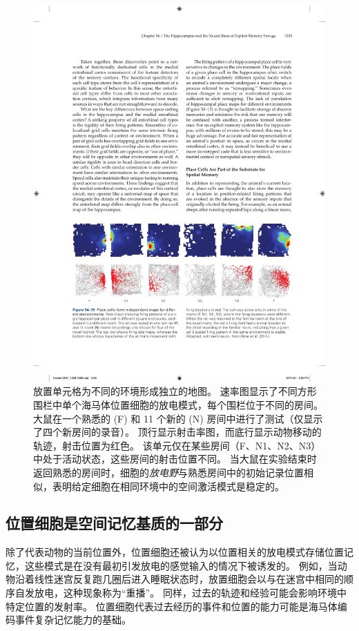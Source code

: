 \begin{figure}[htbp]
	\centering
	\includegraphics[width=0.95\linewidth]{chap54/fig_54_15}
	\caption{放置单元格为不同的环境形成独立的地图。
		速率图显示了不同方形围栏中单个海马体位置细胞的放电模式，每个围栏位于不同的房间。
		大鼠在一个熟悉的 (F) 和 11 个新的 (N) 房间中进行了测试（仅显示了四个新房间的录音）。
		顶行显示射击率图，而底行显示动物移动的轨迹，射击位置为红色。
		该单元仅在某些房间（F、N1、N2、N3）中处于活动状态，这些房间的射击位置不同。
		当大鼠在实验结束时返回熟悉的房间时，细胞的\textit{放电野}与熟悉房间中的初始记录位置相似，表明给定细胞在相同环境中的空间激活模式是稳定的\cite{alme2014place}。}
	\label{fig:54_15}
\end{figure}



\subsection{位置细胞是空间记忆基质的一部分}

除了代表动物的当前位置外，位置细胞还被认为以位置相关的放电模式存储位置记忆，这些模式是在没有最初引发放电的感觉输入的情况下被诱发的。
例如，当动物沿着线性迷宫反复跑几圈后进入睡眠状态时，放置细胞会以与在迷宫中相同的顺序自发放电，这种现象称为“重播”。
同样，过去的轨迹和经验可能会影响环境中特定位置的发射率。
位置细胞代表过去经历的事件和位置的能力可能是海马体编码事件复杂记忆能力的基础。



